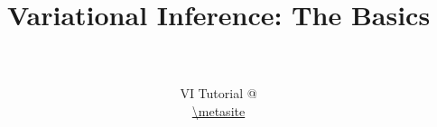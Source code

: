 \documentclass[14pt]{beamer}
\title[VI]{Variational Inference: The Basics}
\date{}
\author[VI Tutorial @ \metahost]{ \metaauthor \\ 
~\\
VI Tutorial @ \metahost \\
\url{\metasite}
}
\begin{document}
\frame{\titlepage}

\frame{\tableofcontents}


\end{document}
